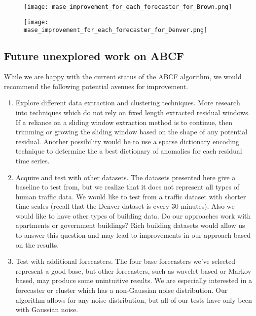 \begin{figure}[!h]
	\begin{center}
		\texttt{[image: mase\_improvement\_for\_each\_forecaster\_for\_Brown.png]}
	\end{center}
	\caption{}
	\label{fig:mase_improve_brown}
\end{figure}

\begin{figure}[!h]
	\begin{center}
		\texttt{[image: mase\_improvement\_for\_each\_forecaster\_for\_Denver.png]}
	\end{center}
	\caption{}
	\label{fig:mase_improve_denver}
\end{figure}

\newpage


\subsection{Future unexplored work on ABCF}
While we are happy with the current status of the ABCF algorithm, we would recommend the following potential avenues for improvement.

\begin{enumerate}
	\item Explore different data extraction and clustering techniques.  More research into techniques which do not rely on fixed length extracted residual windows.  If a reliance on a sliding window extraction method is to continue, then trimming or growing the sliding window based on the shape of any potential residual.  Another possibility would be to use a sparse dictionary encoding technique to determine the a best dictionary of anomalies for each residual time series.
	
	\item Acquire and test with other datasets.  The datasets presented here give a baseline to test from, but we realize that it does not represent all types of human traffic data.  We would like to test from a traffic dataset with shorter time scales (recall that the Denver dataset is every 30 minutes).  Also we would like to have other types of building data.  Do our approaches work with apartments or government buildings?  Rich building datasets would allow us to answer this question and may lead to improvements in our approach based on the results.
	
	\item Test with additional forecasters.  The four base forecasters we've selected represent a good base, but other forecasters, such as wavelet based or Markov based, may produce some unintuitive results.  We are especially interested in a forecaster or cluster which has a non-Gaussian noise distribution.  Our algorithm allows for any noise distribution, but all of our tests have only been with Gaussian noise.
\end{enumerate}

